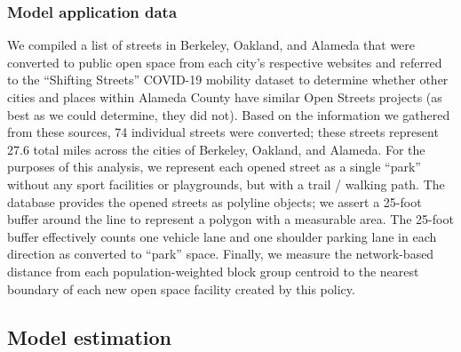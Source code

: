 \documentclass[3p, authoryear, review]{elsarticle} %
\begin{document}
\hypertarget{model-application-data}{%
\subsubsection{Model application data}\label{model-application-data}}

We compiled a list of streets in Berkeley, Oakland, and Alameda that were
converted to public open space from each city's respective websites
\citep{city_of_alameda_slow_2020, city_of_oakland_oakland_2020, city_of_berkeley_berkeley_2020} and referred to the ``Shifting Streets'' COVID-19
mobility dataset \citep{slowstreets} to determine whether other cities and places
within Alameda County have similar Open Streets projects (as best as we could
determine, they did not). Based on the information we gathered from these
sources, 74 individual streets were converted; these streets
represent 27.6 total miles across
the cities of Berkeley, Oakland, and Alameda. For the purposes of this analysis,
we represent each opened street as a single ``park'' without any sport facilities
or playgrounds, but with a trail / walking path. The database provides the
opened streets as polyline objects; we assert a 25-foot buffer around the line
to represent a polygon with a measurable area. The 25-foot buffer effectively
counts one vehicle lane and one shoulder parking lane in each direction as
converted to ``park'' space. Finally, we measure the network-based distance from
each population-weighted block group centroid to the nearest boundary of each
new open space facility created by this policy.

\hypertarget{model-estimation}{%
\subsection{Model estimation}\label{model-estimation}}
\end{document}
